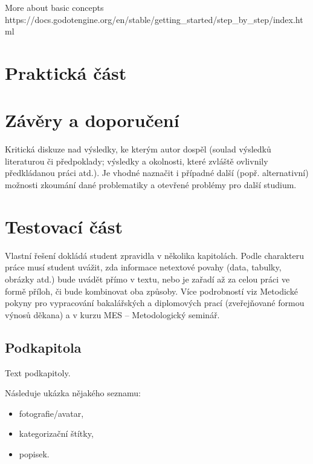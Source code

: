 		More about basic concepts
		https://docs.godotengine.org/en/stable/getting\_started/step\_by\_step/index.html

\section{Praktická část}



\section{Závěry a doporučení}


Kritická diskuze nad výsledky, ke kterým autor dospěl (soulad výsledků  literaturou či předpoklady;
výsledky a okolnosti, které zvláště ovlivnily předkládanou práci atd.). Je vhodné naznačit i případné další
(popř. alternativní) možnosti zkoumání dané problematiky a otevřené problémy pro další studium.

\section{Testovací část}


Vlastní řešení dokládá student zpravidla v několika kapitolách. Podle charakteru práce musí student uvážit, zda informace
netextové povahy (data, tabulky, obrázky atd.) bude uvádět přímo v textu, nebo je zařadí až za celou práci ve formě příloh, či bude kombinovat oba způsoby.
Více podrobností viz Metodické pokyny pro vypracování bakalářských a diplomových prací (zveřejňované formou výnosů děkana)
a v kurzu MES – Metodologický seminář.

	\subsection{Podkapitola}

	Text podkapitoly.

	Následuje ukázka nějakého seznamu:
	\begin{itemize}
		\item fotografie/avatar,
		\item kategorizační štítky,
		\item popisek.
	\end{itemize}

